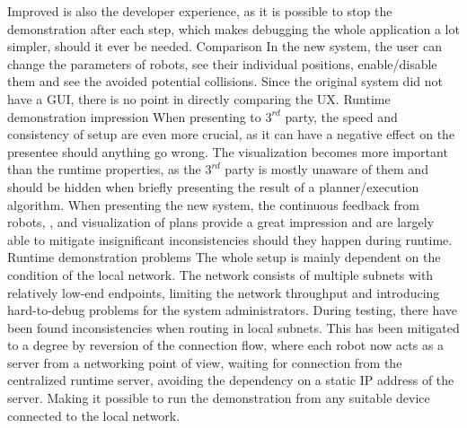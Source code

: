 Improved is also the developer experience, as it is possible to stop the demonstration after each step, which makes debugging the whole application a lot simpler, should it ever be needed.
\secc Comparison
In the new system, the user can change the parameters of robots, see their individual positions, enable/disable them and see the avoided potential collisions. Since the original system did not have a GUI, there is no point in directly comparing the UX. 
\sec Runtime demonstration impression
When presenting to $3^{rd}$ party, the speed and consistency of setup are even more crucial, as it can have a negative effect on the presentee should anything go wrong. The visualization becomes more important than the runtime properties, as the $3^{rd}$ party is mostly unaware of them and should be hidden when briefly presenting the result of a planner/execution algorithm. When presenting the new system, the continuous feedback from robots, {\vicon}, and visualization of plans provide a great impression and are largely able to mitigate insignificant inconsistencies should they happen during runtime.
\sec Runtime demonstration problems
The whole setup is mainly dependent on the condition of the local network. The network consists of multiple subnets with relatively low-end endpoints, limiting the network throughput and introducing hard-to-debug problems for the system administrators. During testing, there have been found inconsistencies when routing in local subnets. This has been mitigated to a degree by reversion of the connection flow, where each robot now acts as a server from a networking point of view, waiting for connection from the centralized runtime server, avoiding the dependency on a static IP address of the server. Making it possible to run the demonstration from any suitable device connected to the local network.